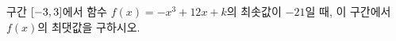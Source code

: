구간 $[-3{,}\mkern3mu\mathopen{}3]$에서 함수 $f(x)=-x^3+12x+k$의 최솟값이 $-21$일 때, 이 구간에서 $f(x)$의 최댓값을 구하시오. 
